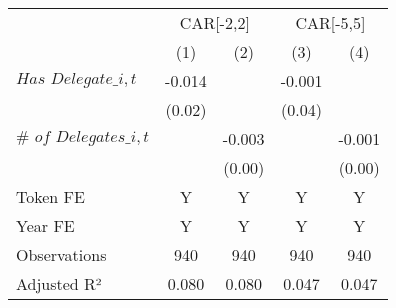 {
\def\sym#1{\ifmmode^{#1}\else\(^{#1}\)\fi}
\begin{tabular}{l*{4}{c}}
\toprule
                    &\multicolumn{2}{c}{CAR[-2,2]}              &\multicolumn{2}{c}{CAR[-5,5]}              \\\cmidrule(lr){2-3}\cmidrule(lr){4-5}
                    &\multicolumn{1}{c}{(1)}         &\multicolumn{1}{c}{(2)}         &\multicolumn{1}{c}{(3)}         &\multicolumn{1}{c}{(4)}         \\
\midrule
$\textit{Has Delegate}\_{i,t}$&      -0.014         &                     &      -0.001         &                     \\
                    &      (0.02)         &                     &      (0.04)         &                     \\
$\textit{# of Delegates}\_{i,t}$&                     &      -0.003         &                     &      -0.001         \\
                    &                     &      (0.00)         &                     &      (0.00)         \\
\midrule
Token FE            &           Y         &           Y         &           Y         &           Y         \\
Year FE             &           Y         &           Y         &           Y         &           Y         \\
Observations        &         940         &         940         &         940         &         940         \\
Adjusted R²         &       0.080         &       0.080         &       0.047         &       0.047         \\
\bottomrule
\end{tabular}
}
